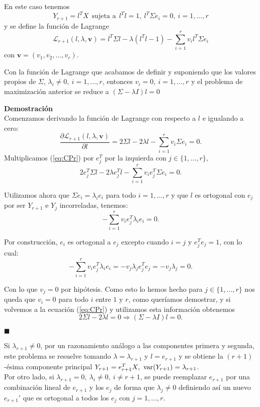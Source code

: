 En este caso tenemos 
\[	Y_{r+1} = l^TX\ \ \text{sujeta a}\ \ l^Tl = 1,\  l^T\Sigma e_i = 0, \ i = 1, \dots, r	\]
y se define la función de Lagrange
\[	\mathcal{L}_{r+1}(l, \lambda, \mathbf{v}) = l^T \Sigma l - \lambda (l^T l - 1) - \sum_{i=1}^r v_i l^T \Sigma e_i	\]
con $\mathbf{v} = (v_1, v_2, \dots, v_r)$.\\

\begin{proposicion}
Con la función de Lagrange que acabamos de definir y suponiendo que los valores propios de $\Sigma$, $\lambda_i \neq 0,\  i=1, \dots, r$, entonces $v_i = 0, \  i=1, \dots, r$ y el problema de maximización anterior se reduce a $(\Sigma - \lambda I)l = 0$
\end{proposicion}
\textbf{Demostración}\\

Comenzamos derivando la función de Lagrange con respecto a $l$ e igualando a cero:
\begin{equation}\label{eq:CPr}
	\frac{\partial \mathcal{L}_{r+1}(l, \lambda, \mathbf{v})}{\partial l} = 2 \Sigma l - 2 \lambda l - \sum_{i=1}^r v_i \Sigma e_i = 0.
\end{equation}
Multiplicamos (\ref{eq:CPr}) por $e_j^T$ por la izquierda con $j \in \{1, \dots, r\}$,
\[	2 e_j^T \Sigma l - 2 \lambda e_j^T l - \sum_{i=1}^r v_i e_j^T \Sigma e_i = 0.	\]

Utilizamos ahora que $\Sigma e_i = \lambda_i e_i$ para todo $i = 1, \dots, r$ y que $l$ es ortogonal con $e_j$ por ser $Y_{r+1}$ e $Y_j$ incorreladas, tenemos:
\[ - \sum_{i=1}^r v_i e_j^T \lambda_i e_i = 0.	\]

Por construcción, $e_i$ es ortogonal a $e_j$ excepto cuando $i=j$ y $e_j^T e_j = 1$, con lo cual:
\[	- \sum_{i=1}^r v_i e_j^T \lambda_i e_i = - v_j \lambda_j e_j^T e_j = - v_j \lambda_j = 0.	\]

Con lo que $v_j = 0$ por hipótesis. Como esto lo hemos hecho para $j \in \{1, \dots, r \}$ nos queda que $v_i = 0$ para todo $i$ entre $1$ y $r$, como queríamos demostrar, y si volvemos a la ecuación (\ref{eq:CPr}) y utilizamos esta información obtenemos
\[	2 \Sigma l - 2 \lambda l = 0 \Rightarrow (\Sigma - \lambda I) l = 0. \]

\begin{flushright}
$\blacksquare$
\end{flushright}

Si $\lambda_{r+1} \neq 0$, por un razonamiento análogo a las componentes primera y segunda, este problema se resuelve tomando $\lambda = \lambda_{r+1}$ y $l = e_{r+1}$ y se obtiene la $(r+1)$-ésima componente principal $Y_{r+1} = e^T_{r+1}X,\ \var{(Y_{r+1})} = \lambda_{r+1}$.\\
Por otro lado, si $\lambda_{r+1} = 0,\ \lambda_i \neq 0,\ i \neq r+1$, se puede reemplazar $e_{r+1}$ por una combinación lineal de $e_{r+1}$ y los $e_j$ de forma que $\lambda_j \neq 0$ definiendo así un nuevo $e_{r+1}'$ que es ortogonal a todos los $e_j$ con $j = 1, \dots, r$.\\

